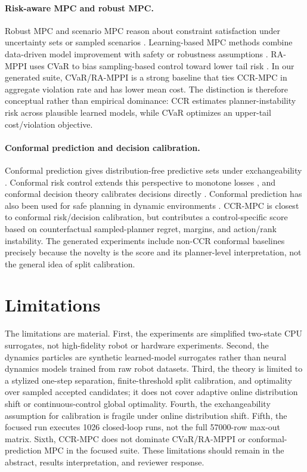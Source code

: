 \documentclass[11pt]{article}
\begin{document}
\paragraph{Risk-aware MPC and robust MPC.}
Robust MPC and scenario MPC reason about constraint satisfaction under uncertainty sets or sampled scenarios \citep{mayne2005robustmpc,calafiore2013scenario}. Learning-based MPC methods combine data-driven model improvement with safety or robustness assumptions \citep{aswani2013lbmpc,koller2018safeexploration}. RA-MPPI uses CVaR to bias sampling-based control toward lower tail risk \citep{yin2023ramppi}. In our generated suite, CVaR/RA-MPPI is a strong baseline that ties CCR-MPC in aggregate violation rate and has lower mean cost. The distinction is therefore conceptual rather than empirical dominance: CCR estimates planner-instability risk across plausible learned models, while CVaR optimizes an upper-tail cost/violation objective.

\paragraph{Conformal prediction and decision calibration.}
Conformal prediction gives distribution-free predictive sets under exchangeability \citep{angelopoulos2023gentle}. Conformal risk control extends this perspective to monotone losses \citep{angelopoulos2024conformalrisk}, and conformal decision theory calibrates decisions directly \citep{lekeufack2023conformaldecision}. Conformal prediction has also been used for safe planning in dynamic environments \citep{lindemann2023safeplanning}. CCR-MPC is closest to conformal risk/decision calibration, but contributes a control-specific score based on counterfactual sampled-planner regret, margins, and action/rank instability. The generated experiments include non-CCR conformal baselines precisely because the novelty is the score and its planner-level interpretation, not the general idea of split calibration.

\section{Limitations}

The limitations are material. First, the experiments are simplified two-state CPU surrogates, not high-fidelity robot or hardware experiments. Second, the dynamics particles are synthetic learned-model surrogates rather than neural dynamics models trained from raw robot datasets. Third, the theory is limited to a stylized one-step separation, finite-threshold split calibration, and optimality over sampled accepted candidates; it does not cover adaptive online distribution shift or continuous-control global optimality. Fourth, the exchangeability assumption for calibration is fragile under online distribution shift. Fifth, the focused run executes 1026 closed-loop runs, not the full 57000-row max-out matrix. Sixth, CCR-MPC does not dominate CVaR/RA-MPPI or conformal-prediction MPC in the focused suite. These limitations should remain in the abstract, results interpretation, and reviewer response.
\end{document}
